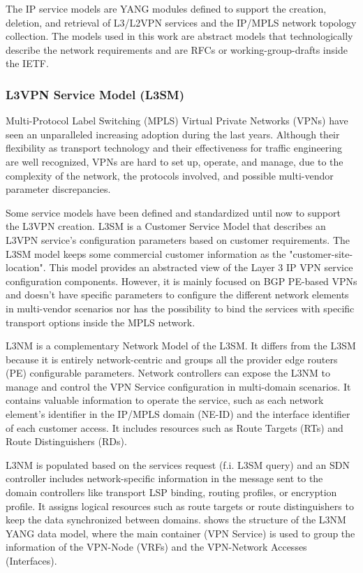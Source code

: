 \documentclass[10pt, conference]{IEEEtran}
\begin{document}
The IP service models are YANG modules defined to support the creation, deletion, and retrieval of L3/L2VPN services and the IP/MPLS network topology collection. The models used in this work are abstract models that technologically describe the network requirements and are RFCs or working-group-drafts inside the IETF.

\subsubsection{L3VPN Service Model (L3SM)}
\label{section:l3nm}
Multi-Protocol Label Switching (MPLS) Virtual Private Networks (VPNs) have seen an unparalleled increasing adoption during the last years. Although their flexibility as transport technology and their effectiveness for traffic engineering are well recognized, VPNs are hard to set up, operate, and manage, due to the complexity of the network, the protocols involved, and possible multi-vendor parameter discrepancies.

Some service models have been defined and standardized until now to support the L3VPN creation. L3SM \cite{rfc8299} is a Customer Service Model that describes an L3VPN service's configuration parameters based on customer requirements. The L3SM model keeps some commercial customer information as the "customer-site-location". This model provides an abstracted view of the Layer 3 IP VPN service configuration components. However, it is mainly focused on BGP PE-based VPNs and doesn't have specific parameters to configure the different network elements in multi-vendor scenarios nor has the possibility to bind the services with specific transport options inside the MPLS network.  

L3NM \cite{voyer2019internet} is a complementary Network Model of the L3SM. It differs from the L3SM because it is entirely network-centric and groups all the provider edge routers (PE) configurable parameters. Network controllers can expose the L3NM to manage and control the VPN Service configuration in multi-domain scenarios. It contains valuable information to operate the service, such as each network element's identifier in the IP/MPLS domain (NE-ID) and the interface identifier of each customer access. It includes resources such as Route Targets (RTs) and Route Distinguishers (RDs).

L3NM is populated based on the services request (f.i. L3SM query) and an SDN controller includes network-specific information in the message sent to the domain controllers like transport LSP binding, routing profiles, or encryption profile. It assigns logical resources such as route targets or route distinguishers to keep the data synchronized between domains.  shows the structure of the L3NM YANG data model, where the main container (VPN Service) is used to group the information of the VPN-Node (VRFs) and the VPN-Network Accesses (Interfaces).
\end{document}
